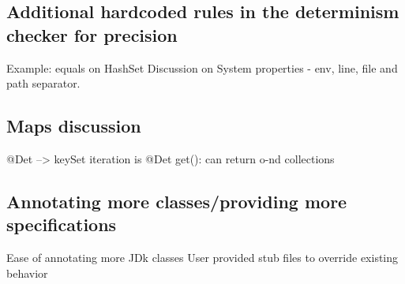 \subsection{Additional hardcoded rules in the determinism checker  for precision}
Example: equals on HashSet
Discussion on System properties - env, line, file and path separator.

\subsection{Maps discussion}
@Det --> keySet iteration is @Det
get(): can return o-nd collections

\subsection{Annotating more classes/providing more specifications}
Ease of annotating more JDk classes
User provided stub files to override existing behavior
